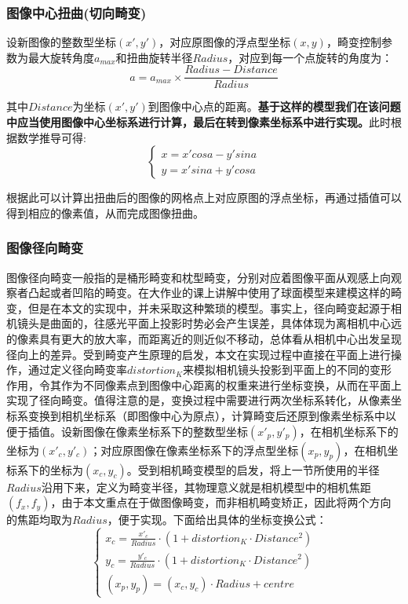 \documentclass[UTF8]{ctexart}
\begin{document}
\subsubsection{图像中心扭曲(切向畸变)}
设新图像的整数型坐标$(x',y')$，对应原图像的浮点型坐标$(x,y)$，畸变控制参数为最大旋转角度$a_{max}$和扭曲旋转半径$Radius$，对应到每一个点旋转的角度为：
$$a=a_{max}\times \frac{Radius-Distance}{Radius}$$

其中$Distance$为坐标$(x',y')$到图像中心点的距离。\textbf{基于这样的模型我们在该问题中应当使用图像中心坐标系进行计算，最后在转到像素坐标系中进行实现。}此时根据数学推导可得:
\begin{equation}
    \begin{cases}
    x=x'cosa - y'sina\\ 
    y=x'sina+y'cosa
    \end{cases}
\end{equation}

根据此可以计算出扭曲后的图像的网格点上对应原图的浮点坐标，再通过插值可以得到相应的像素值，从而完成图像扭曲。

\subsubsection{图像径向畸变}

图像径向畸变一般指的是桶形畸变和枕型畸变，分别对应着图像平面从观感上向观察者凸起或者凹陷的畸变。在大作业的课上讲解中使用了球面模型来建模这样的畸变，但是在本文的实现中，并未采取这种繁琐的模型。事实上，径向畸变起源于相机镜头是曲面的，往感光平面上投影时势必会产生误差，具体体现为离相机中心远的像素具有更大的放大率，而距离近的则近似不移动，总体看从相机中心出发呈现径向上的差异。受到畸变产生原理的启发，本文在实现过程中直接在平面上进行操作，通过定义径向畸变率$distortion_K$来模拟相机镜头投影到平面上的不同的变形作用，令其作为不同像素点到图像中心距离的权重来进行坐标变换，从而在平面上实现了径向畸变。值得注意的是，变换过程中需要进行两次坐标系转化，从像素坐标系变换到相机坐标系（即图像中心为原点），计算畸变后还原到像素坐标系中以便于插值。设新图像在像素坐标系下的整数型坐标$(x'_p,y'_p)$，在相机坐标系下的坐标为$(x'_c,y'_c)$；对应原图像在像素坐标系下的浮点型坐标$(x_p,y_p)$，在相机坐标系下的坐标为$(x_c,y_c)$。受到相机畸变模型的启发，将上一节所使用的半径$Radius$沿用下来，定义为畸变半径，其物理意义就是相机模型中的相机焦距$(f_x,f_y)$，由于本文重点在于做图像畸变，而非相机畸变矫正，因此将两个方向的焦距均取为$Radius$，便于实现。下面给出具体的坐标变换公式：
\begin{equation}
    \begin{cases}
        x_c = \frac{x'_c}{Radius} \cdot (1+distortion_K \cdot Distance^2)\\
        y_c = \frac{y'_c}{Radius} \cdot (1+distortion_K \cdot Distance^2)\\
        (x_p,y_p) = (x_c,y_c)\cdot Radius + centre
    \end{cases}
\end{equation}
\end{document}

